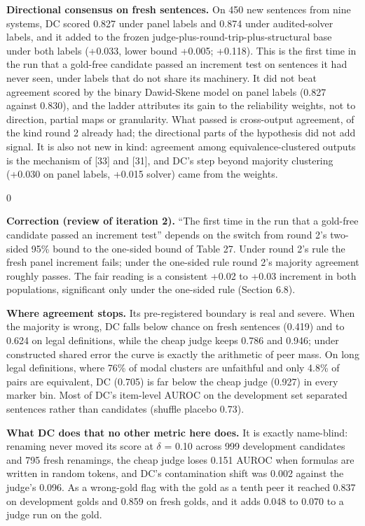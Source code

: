 \documentclass[11pt,letterpaper]{article}
\newenvironment{correction}{\par\medskip\noindent\begin{minipage}{\linewidth}\setlength{\fboxsep}{6pt}\begin{lrbox}{0}\begin{minipage}{0.96\linewidth}\small}{\end{minipage}\end{lrbox}\colorbox{black!6}{\usebox{0}}\end{minipage}\par\medskip}
\begin{document}
\textbf{Directional consensus on fresh sentences.} On 450 new sentences from nine systems, DC scored 0.827 under panel labels and 0.874 under audited-solver labels, and it added to the frozen judge-plus-round-trip-plus-structural base under both labels (+0.033, lower bound +0.005; +0.118). This is the first time in the run that a gold-free candidate passed an increment test on sentences it had never seen, under labels that do not share its machinery. It did not beat agreement scored by the binary Dawid-Skene model on panel labels (0.827 against 0.830), and the ladder attributes its gain to the reliability weights, not to direction, partial maps or granularity. What passed is cross-output agreement, of the kind round 2 already had; the directional parts of the hypothesis did not add signal. It is also not new in kind: agreement among equivalence-clustered outputs is the mechanism of [33] and [31], and DC's step beyond majority clustering (+0.030 on panel labels, +0.015 solver) came from the weights.

\begin{correction}\textbf{Correction (review of iteration 2).} ``The first time in the run that a gold-free candidate passed an increment test'' depends on the switch from round 2's two-sided 95\% bound to the one-sided bound of Table 27. Under round 2's rule the fresh panel increment fails; under the one-sided rule round 2's majority agreement roughly passes. The fair reading is a consistent +0.02 to +0.03 increment in both populations, significant only under the one-sided rule (Section 6.8).\end{correction}

\textbf{Where agreement stops.} Its pre-registered boundary is real and severe. When the majority is wrong, DC falls below chance on fresh sentences (0.419) and to 0.624 on legal definitions, while the cheap judge keeps 0.786 and 0.946; under constructed shared error the curve is exactly the arithmetic of peer mass. On long legal definitions, where 76\% of modal clusters are unfaithful and only 4.8\% of pairs are equivalent, DC (0.705) is far below the cheap judge (0.927) in every marker bin. Most of DC's item-level AUROC on the development set separated sentences rather than candidates (shuffle placebo 0.73).

\textbf{What DC does that no other metric here does.} It is exactly name-blind: renaming never moved its score at $\delta$ = 0.10 across 999 development candidates and 795 fresh renamings, the cheap judge loses 0.151 AUROC when formulas are written in random tokens, and DC's contamination shift was 0.002 against the judge's 0.096. As a wrong-gold flag with the gold as a tenth peer it reached 0.837 on development golds and 0.859 on fresh golds, and it adds 0.048 to 0.070 to a judge run on the gold.
\end{document}
